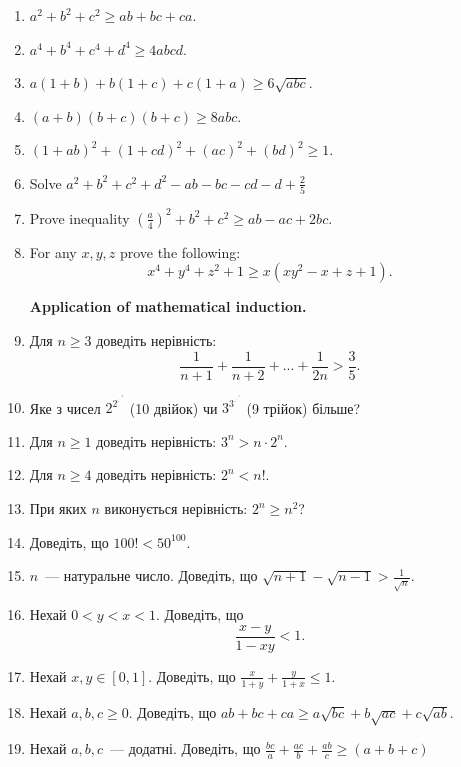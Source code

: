 \documentclass[a4paper,12pt]{article}
\begin{document}
\begin{enumerate}
 \item $a^{2}+b^{2}+c^{2}\geq ab+bc+ca$.

\item $a^{4}+b^{4}+c^{4}+d^{4}\geq 4abcd$.

\item $a(1+b)+b(1+c)+c(1+a)\geq 6\sqrt{abc}$.

\item $(a+b)(b+c)(b+c)\geq 8abc$.

\item $(1+ab)^{2}+(1+cd)^{2}+(ac)^{2}+(bd)^{2}\geq 1$.

\item Solve $a^{2}+b^{2}+c^{2}+d^{2}-ab-bc-cd-d+\frac{2}{5}$

\item Prove inequality $(\frac{a}{4})^{2}+b^{2}+c^{2}\geq ab-ac+2bc$.

\item For any $x,y,z$ prove the following: $$x^{4}+y^{4}+z^{2}+1\geq x(xy^{2}-x+z+1).$$

\textbf{Application of mathematical induction.}

\item Для $n\geq3$ доведіть нерівність: $$\frac{1}{n+1}+\frac{1}{n+2}+...+\frac{1}{2n}>\frac{3}{5}.$$

\item Яке з чисел $2^{2^{.^{.^{.^{2}}}}}$ (10 двійок) чи $3^{3^{.^{.^{.^{3}}}}}$ (9 трійок) більше?

\item Для $n\geq1$ доведіть нерівність: $3^{n}>n\cdot 2^{n}$.

\item Для $n\geq4$ доведіть нерівність: $2^{n}<n!$.

\item При яких $n$ виконується нерівність: $2^{n}\geq n^{2}$?

\item Доведіть, що $100!<50^{100}$.

\item $n$~--- натуральне число. Доведіть, що $\sqrt{n+1}-\sqrt{n-1}>\frac{1}{\sqrt{n}}$.

\item Нехай $0<y<x<1$. Доведіть, що $$\frac{x-y}{1-xy}<1.$$

\item Нехай $x,y\in [0,1]$. Доведіть, що $\frac{x}{1+y}+\frac{y}{1+x}\leq 1$.

\item Нехай $a,b,c\geq0$. Доведіть, що $ab+bc+ca\geq a\sqrt{bc}+b\sqrt{ac}+c\sqrt{ab}$.

\item Нехай $a,b,c$~--- додатні. Доведіть, що $\frac{bc}{a}+\frac{ac}{b}+\frac{ab}{c}\geq (a+b+c)$


\end{enumerate}
\end{document}

